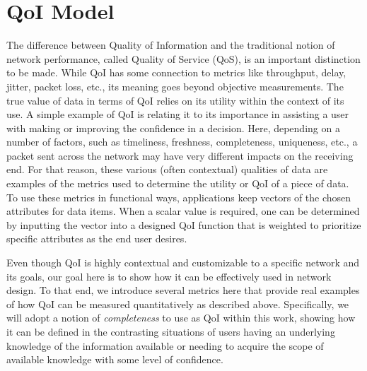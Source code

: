 \section{QoI Model}
\label{sec:qoi_model}

The difference between Quality of Information and the traditional notion of network performance, called Quality of Service (QoS), is an important distinction to be made.  While QoI has some connection to metrics like throughput, delay, jitter, packet loss, etc., its meaning goes beyond objective measurements.  The true value of data in terms of QoI relies on its utility within the context of its use.  A simple example of QoI is relating it to its importance in assisting a user with making or improving the confidence in a decision.  Here, depending on a number of factors, such as timeliness, freshness, completeness, uniqueness, etc., a packet sent across the network may have very different impacts on the receiving end.  For that reason, these various (often contextual) qualities of data are examples of the metrics used to determine the utility or QoI of a piece of data.  To use these metrics in functional ways, applications keep vectors of the chosen attributes for data items.  When a scalar value is required, one can be determined by inputting the vector into a designed QoI function that is weighted to prioritize specific attributes as the end user desires.


Even though QoI is highly contextual and customizable to a specific network and its goals, our goal here is to show how it can be effectively used in network design.  To that end, we introduce several metrics here that provide real examples of how QoI can be measured quantitatively as described above.  Specifically, we will adopt a notion of \emph{completeness} to use as QoI within this work, showing how it can be defined in the contrasting situations of users having an underlying knowledge of the information available or needing to acquire the scope of available knowledge with some level of confidence. 

